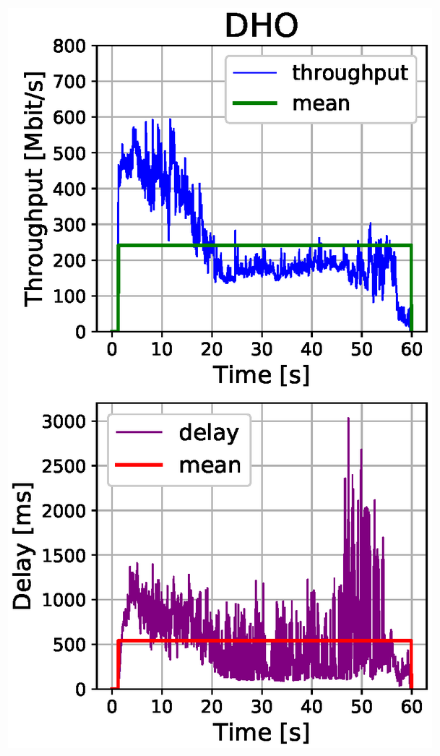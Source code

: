 \documentclass[conference,10pt]{IEEEtran}
\begin{document}
\begin{enumerate}
\begin{figure}[!t]
	\begin{minipage}{.245\textwidth}
		\centering
		\includegraphics[width=\linewidth, keepaspectratio]{images/results_dho.eps}
		\label{fig:test1}
	\end{minipage}%
	\begin{minipage}{.245\textwidth}
		\centering

\end{minipage}
\end{figure}
\end{enumerate}
\end{document}
